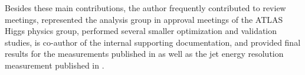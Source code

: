 Besides these main contributions, the author frequently contributed to review meetings, represented the \HWW analysis group in approval meetings of the ATLAS Higgs physics group, performed several smaller optimization and validation studies, is co-author of the internal supporting documentation, and provided final results for the measurements published in  as well as the jet energy resolution measurement published in .



